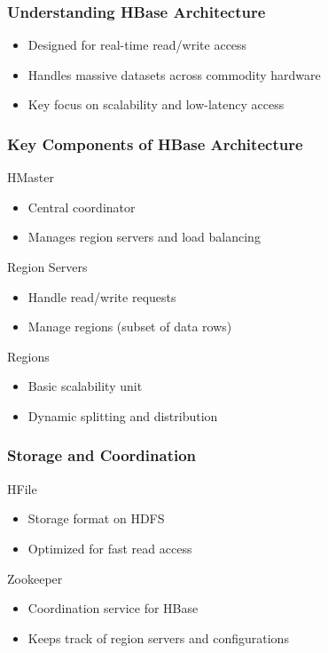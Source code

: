 \documentclass[aspectratio=169]{beamer}
\begin{document}
\begin{frame}[fragile]
    \frametitle{Understanding HBase Architecture}
    \begin{itemize}
        \item Designed for real-time read/write access
        \item Handles massive datasets across commodity hardware
        \item Key focus on scalability and low-latency access
    \end{itemize}
\end{frame}

\begin{frame}[fragile]
    \frametitle{Key Components of HBase Architecture}
    \begin{block}{HMaster}
        \begin{itemize}
            \item Central coordinator
            \item Manages region servers and load balancing
        \end{itemize}
    \end{block}

    \begin{block}{Region Servers}
        \begin{itemize}
            \item Handle read/write requests
            \item Manage regions (subset of data rows)
        \end{itemize}
    \end{block}

    \begin{block}{Regions}
        \begin{itemize}
            \item Basic scalability unit
            \item Dynamic splitting and distribution
        \end{itemize}
    \end{block}
\end{frame}

\begin{frame}[fragile]
    \frametitle{Storage and Coordination}
    \begin{block}{HFile}
        \begin{itemize}
            \item Storage format on HDFS
            \item Optimized for fast read access
        \end{itemize}
    \end{block}
    
    \begin{block}{Zookeeper}
        \begin{itemize}
            \item Coordination service for HBase
            \item Keeps track of region servers and configurations
        \end{itemize}
    \end{block}
\end{frame}
\end{document}

